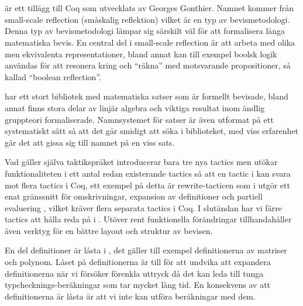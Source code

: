 \section{\ssr}
\ssr är ett tillägg till Coq som utvecklats av Georges Gonthier.
Namnet kommer från small-scale reflection (småskalig reflektion) vilket är en typ av
bevismetodologi. Denna typ av bevismetodologi lämpar sig särskilt väl för att
formalisera långa matematiska bevis.
En central del i small-scale reflection är att arbeta med olika men ekvivalenta
representationer,
bland annat kan till exempel boolsk logik användas för att resonera
kring och ``räkna'' med motsvarande propositioner, så kallad ``boolean
reflection''.

\ssr har ett stort bibliotek med matematiska satser som är formellt bevisade,
bland annat finns stora delar av linjär algebra och viktiga resultat inom
ändlig gruppteori formaliserade. Namnsystemet för satser är även utformat på ett
systematiskt sätt så att det går smidigt att söka i biblioteket, med viss
erfarenhet går det att gissa sig till namnet på en viss sats.

Vad gäller själva taktikspråket introducerar \ssr bara tre nya tactics men
utökar funktionaliteten i ett antal redan existerande tactics så att en tactic
i \ssr kan svara mot flera tactics i Coq, ett exempel på detta är
rewrite-tacticen som i \ssr utgör ett enat gränssnitt för omskrivningar,
expansion av definitioner och partiell evaluering \cite{gonthier2008small},
vilket kräver flera separata tactics i Coq.
I slutändan har vi färre tactics att hålla reda på i \ssr. Utöver rent funktionella
förändringar tillhandahåller \ssr även verktyg för en bättre layout och
struktur av bevisen.

En del definitioner är låsta i \ssr, det gäller till exempel definitionerna av
matriser och polynom. Låset på definitionerna är till för att undvika att
expandera definitionerna när vi försöker förenkla uttryck då det kan leda till
tunga typchecknings-beräkningar som tar mycket lång tid. En konsekvens av att
definitionerna är låsta är att vi inte kan utföra beräkningar med dem.

